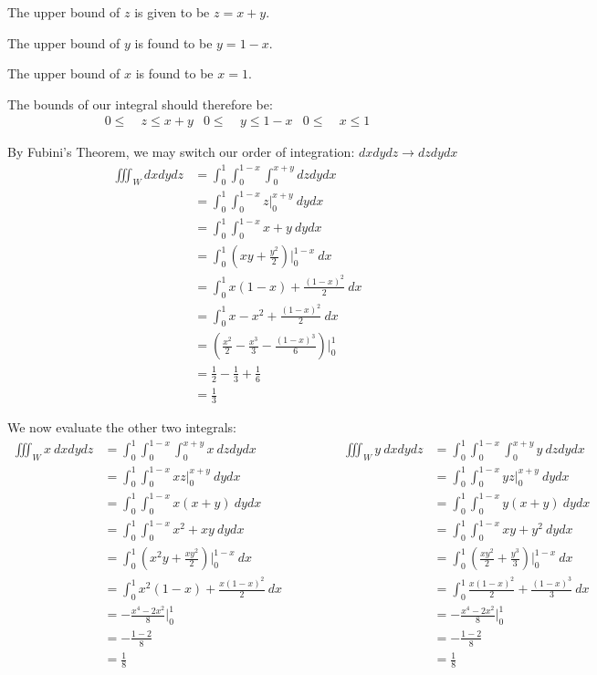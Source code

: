\begin{solution}
    The upper bound of \(z\) is given to be \(z = x + y\).
    
    The upper bound of \(y\) is found to be \(y = 1 - x\). 
    
    The upper bound of \(x\) is found to be \(x = 1\).
    
    The bounds of our integral should therefore be:
    \begin{align}
        0 \leq & \ z \leq x + y & 0 \leq & \ y \leq 1 - x & 0 \leq & \ x \leq 1
    \end{align}
    
    By Fubini's Theorem, we may switch our order of integration: \(dxdydz \rightarrow dzdydx\)
    \begin{align*}
        \iiint_W dxdydz &= \int_0^1 \int_0^{1 - x}\int_0^{x + y} dzdydx \\
        &= \int_0^1 \int_0^{1 - x} z \Big|_{0}^{x + y} \ dydx \\
        &= \int_0^1 \int_0^{1 - x}x + y \ dydx \\
        &= \int_0^1 \left(xy + \frac{y^2}{2}\right) \Big|_0^{1 - x} \ dx \\
        &= \int_0^1 x(1 - x) + \frac{(1 - x)^2}{2} \ dx \\
        &= \int_0^1 x - x^2 + \frac{(1 - x)^2}{2} \ dx \\
        &= \left(\frac{x^2}{2} - \frac{x^3}{3} - \frac{(1 - x)^3}{6}\right) \Biggr|_0^1 \\
        &= \frac{1}{2} - \frac{1}{3} + \frac{1}{6} \\
        &= \frac{1}{3}
    \end{align*}
    
    We now evaluate the other two integrals:
    \begin{align*}
        \iiint_W x \ dxdydz &= \int_0^1 \int_0^{1 - x}\int_0^{x + y} x \ dzdydx \quad \quad \quad \quad \quad \quad & \iiint_W y \ dxdydz &= \int_0^1 \int_0^{1 - x}\int_0^{x + y} y \ dzdydx \\
        &= \int_0^1 \int_0^{1 - x} xz \Big|_{0}^{x + y} \ dydx & &= \int_0^1 \int_0^{1 - x} yz \Big|_{0}^{x + y} \ dydx \\
        &= \int_0^1 \int_0^{1 - x} x(x + y) \ dydx & &= \int_0^1 \int_0^{1 - x} y(x + y) \ dydx \\
        &= \int_0^1 \int_0^{1 - x} x^2 + xy \ dydx & &= \int_0^1 \int_0^{1 - x} xy + y^2 \ dydx \\
        &= \int_0^1 \left(x^2y + \frac{xy^2}{2}\right) \Biggr|_0^{1 - x} \ dx & &= \int_0^1 \left(\frac{xy^2}{2} + \frac{y^3}{3}\right)\Biggr|_0^{1 - x} \ dx \\
        &= \int_0^1 x^2(1 - x) + \frac{x(1 - x)^2}{2} \ dx & &= \int_0^1 \frac{x(1 - x)^2}{2} + \frac{(1 - x)^3}{3} \ dx \\
        &= -\frac{x^4 - 2x^2}{8} \Biggr|_0^1 & &= -\frac{x^4 - 2x^2}{8} \Biggr|_0^1 \\
        &= -\frac{1 - 2}{8} & &= -\frac{1 - 2}{8} \\
        &= \frac{1}{8} & &= \frac{1}{8} 
    \end{align*}
\end{solution}